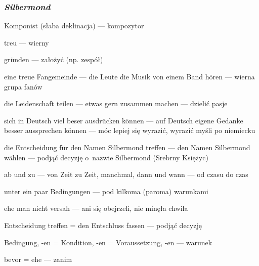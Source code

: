 \subsubsection*{\textit{Silbermond}}
\begin{words}
    \item[\der Komponist] (słaba deklinacja) --- kompozytor
    \item[treu] --- wierny
    \item[gründen] --- założyć (np. zespół)
    \item[eine treue Fangemeinde] --- die Leute die Musik von einem Band hören --- wierna grupa fanów
    \item[die Leidenschaft teilen] --- etwas gern zusammen machen --- dzielić pasje
    \item[sich in Deutsch viel beser ausdrücken können] --- auf Deutsch eigene Gedanke besser aussprechen können --- móc lepiej się wyrazić, wyrazić myśli po niemiecku
    \item[die Entscheidung für den Namen Silbermond treffen] --- den Namen Silbermond wählen --- podjąć decyzję o~nazwie Silbermond (Srebrny Księżyc)
    \item[ab und zu] --- von Zeit zu Zeit, manchmal, dann und wann --- od czasu do czas
    \item[unter ein paar Bedingungen] --- pod kilkoma (paroma) warunkami
    \item[ehe man nicht versah] --- ani się obejrzeli, nie minęła chwila
    \item[\die Entscheidung treffen = den Entschluss fassen] --- podjąć decyzję
    \item[\die Bedingung, -en = \die Kondition, -en = \die Voraussetzung, -en] --- warunek
    \item[bevor = ehe] --- zanim
\end{words}

